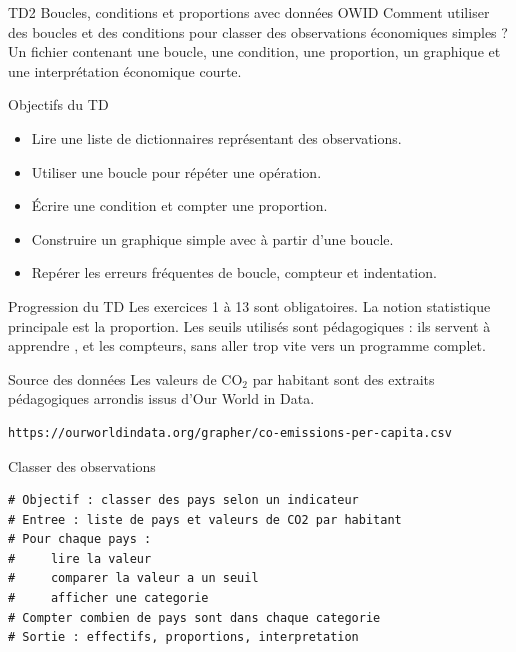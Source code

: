 \documentclass[11pt,a4paper]{article}
\begin{document}
\workbooktitle
  {TD2}
  {Boucles, conditions et proportions avec données OWID}
  {Comment utiliser des boucles et des conditions pour classer des observations économiques simples ?}
  {Un fichier  contenant une boucle, une condition, une proportion, un graphique  et une interprétation économique courte.}

\begin{objectivebox}{Objectifs du TD}
\begin{itemize}
  \item Lire une liste de dictionnaires représentant des observations.
  \item Utiliser une boucle  pour répéter une opération.
  \item Écrire une condition  et compter une proportion.
  \item Construire un graphique simple avec  à partir d'une boucle.
  \item Repérer les erreurs fréquentes de boucle, compteur et indentation.
\end{itemize}
\end{objectivebox}

\begin{checkpointbox}{Progression du TD}
Les exercices 1 à 13 sont obligatoires. La notion statistique principale est la proportion. Les seuils utilisés sont pédagogiques : ils servent à apprendre ,  et les compteurs, sans aller trop vite vers un programme complet.
\end{checkpointbox}

\begin{checkpointbox}{Source des données}
Les valeurs de CO$_2$ par habitant sont des extraits pédagogiques arrondis issus d'Our World in Data.
\begin{lstlisting}[language=terminal]
https://ourworldindata.org/grapher/co-emissions-per-capita.csv
\end{lstlisting}
\end{checkpointbox}

\begin{pseudocodeexercise}{Classer des observations}
\begin{lstlisting}
# Objectif : classer des pays selon un indicateur
# Entree : liste de pays et valeurs de CO2 par habitant
# Pour chaque pays :
#     lire la valeur
#     comparer la valeur a un seuil
#     afficher une categorie
# Compter combien de pays sont dans chaque categorie
# Sortie : effectifs, proportions, interpretation
\end{lstlisting}
\end{pseudocodeexercise}
\end{document}
